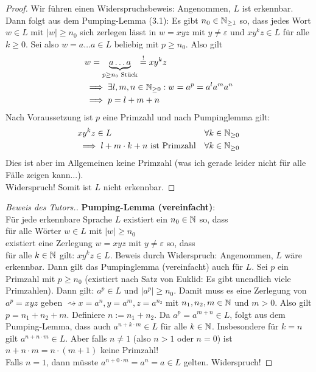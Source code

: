 \documentclass[12pt,a4paper]{article}
\begin{document}
\begin{proof}
	Wir führen einen Widerspruchsbeweis: Angenommen, $L$ ist erkennbar.
	Dann folgt aus dem Pumping-Lemma (3.1): Es gibt $n_0\in\mathbb{N}_{\geq1}$ so, dass jedes Wort $w\in L$ mit $|w|\geq n_0$ sich zerlegen lässt in $w=xyz$ mit $y\neq\varepsilon$ und $xy^kz\in L$ für alle $k\geq0$.
	Sei also $w=a\ldots a\in L$ beliebig mit $p\geq n_0$. Also gilt
	\begin{align*}
		&w=\underbrace{a\ldots a}_{p\geq n_0\text{ Stück}}\overset{!}= xy^k z\\
		&\implies \exists l,m,n\in\mathbb{N}_{\geq0}: w=a^p=a^l a^m a^n\\
		&\implies p=l+m+n
	\end{align*}
	Nach Voraussetzung ist $p$ eine Primzahl und nach Pumpinglemma gilt:
	\begin{align*}
		&x y^k z\in L &\forall k\in\mathbb{N}_{\geq0}\\
		&\implies l+m\cdot k+ n\text{ ist Primzahl} &\forall k\in\mathbb{N}_{\geq0}
	\end{align*}
	Dies ist aber im Allgemeinen keine Primzahl (was ich gerade leider nicht für alle Fälle zeigen kann...).\\
	Widerspruch! Somit ist $L$ nicht erkennbar.
\end{proof}

\begin{proof}[Beweis des Tutors.]\enter
	\textbf{Pumping-Lemma (vereinfacht)}:\\
	Für jede erkennbare Sprache $L$ existiert ein $n_0\in\mathbb{N}$ so, dass\\
	für alle Wörter $w\in L$ mit $|w|\geq n_0$\\
	existiert eine Zerlegung $w=xyz$ mit $y\neq\varepsilon$ so, dass\\
	für alle $k\in\mathbb{N}$ gilt: $xy^kz\in L$.\nl
	Beweis durch Widerspruch:
	Angenommen, $L$ wäre erkennbar. Dann gilt das Pumpinglemma (vereinfacht) auch für $L$.
	Sei $p$ ein Primzahl mit $p\geq n_0$ (existiert nach Satz von Euklid: Es gibt unendlich viele Primzahlen).
	Dann gilt:
	$a^p\in L$ und $|a^p|\geq n_0$.
	Damit muss es eine Zerlegung von $a^p=xyz$ geben $\rightsquigarrow x=a^n,y=a^m,z=a^{n_2}$ mit $n_1,n_2,m\in\mathbb{N}$ und $m>0$.
	Also gilt $p=n_1+n_2+m$. 
	Definiere $n:=n_1+n_2$.
	Da $a^p=a^{m+n}\in L$, folgt aus dem Pumping-Lemma,
	dass auch $a^{n+k\cdot m}\in L$ für alle $k\in\mathbb{N}$.
	Insbesondere für $k=n$ %
	gilt $a^{n+n\cdot m}\in L$.
	Aber falls $n\neq1$ (also $n>1$ oder $n=0$) ist $n+n\cdot m=n\cdot(m+1)$ keine Primzahl!\\
	Falls $n=1$, dann müsste $a^{n+0\cdot m}=a^n=a\in L$ gelten. Widerspruch!
\end{proof}
\end{document}
